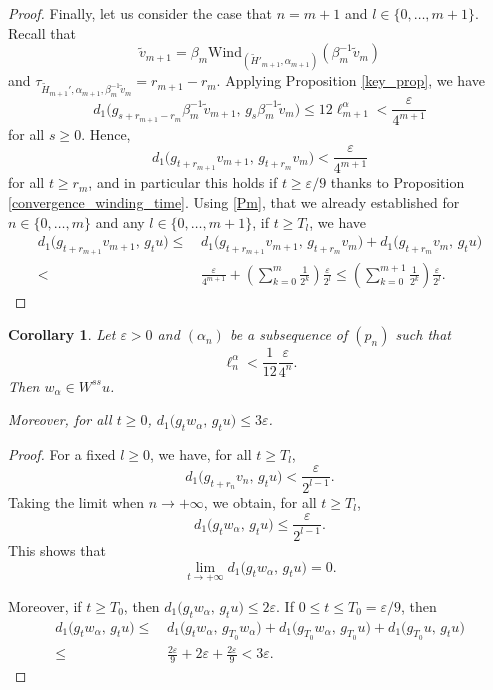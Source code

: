 \documentclass[a4paper,english,reqno]{amsart}
\newtheorem{corollary}{Corollary}
\theoremstyle{definition}
\numberwithin{equation}{section}
\begin{document}
\begin{proof}
Finally, let us consider the case that $n=m+1$ and $l\in \{0,\dots,m+1\}$. 
Recall that \[\tilde v_{m+1}=\beta_m \mathrm{Wind}_{(\tilde  H'_{m+1}, \alpha_{m+1})}(\beta_m^{-1} \tilde v_m)\] and $\tau_{\tilde H_{m+1}', \alpha_{m+1}, \beta_{m}^{-1}\tilde v_m} = r_{m+1}-r_m$. Applying Proposition \ref{key_prop}, we have
\[
d_1\big(g_{s+r_{m+1}-r_m} \beta_m^{-1}\tilde v_{m+1},\, g_{s} \beta_m^{-1} \tilde v_m\big) \le 12 \ell^{\alpha}_{m+1} < \frac{\varepsilon}{4^{m+1}}
\]
for all $s\ge 0$. Hence,
\[
d_1\big(g_{t+r_{m+1}} v_{m+1},\, g_{t+r_m} v_m\big) < \frac{\varepsilon}{4^{m+1}}
\]
for all $t\ge r_m$, and in particular this holds if $t\ge \varepsilon/ 9$ thanks to Proposition \ref{convergence_winding_time}. Using \ref{Pm}, that we already established for $n\in\{0,\dots,m\}$ and any $l\in \{0,\dots,m+1\}$, if $t\ge T_l$, we have
\begin{align*}
	d_1\big(g_{t+r_{m+1}} v_{m+1},\, g_t u\big) \le & \, d_1\big(g_{t+r_{m+1}} v_{m+1},\, g_{t+r_m} v_m\big) + d_1\big(g_{t+r_m} v_m,\, g_t u\big) \\
	 <& \, \frac{\varepsilon}{4^{m+1}} + \left(\sum_{k=0}^{m} \frac{1}{2^k}\right)\frac{\varepsilon}{2^l} \le \left(\sum_{k=0}^{m+1} \frac{1}{2^k}\right)\frac{\varepsilon}{2^l}.
\end{align*}

	
\end{proof}

\begin{corollary}\label{cor1}
	Let $\varepsilon>0$ and $(\alpha_n)$ be a subsequence of $(p_n)$ such that
	\[
	\ell_n^\alpha < \frac{1}{12}\frac{\varepsilon}{4^n}.
	\]
	Then $w_\alpha \in W^{ss} u$.
	
	Moreover, for all $t\ge 0$, $d_1\big(g_{t} w_{\alpha},\, g_t u\big)\le 3\varepsilon$.
\end{corollary}
\begin{proof}
	For a fixed $l\ge 0$, we have, for all $t\ge T_l$,
	\[
	d_1\big(g_{t+r_n} v_n,\, g_t u\big)
	<
	\frac{\varepsilon}{2^{l-1}}.
	\]
	Taking the limit when $n\to +\infty$, we obtain, for all $t\ge T_l$,
	\[
	d_1\big(g_{t} w_{\alpha},\, g_t u\big)
	\le
	\frac{\varepsilon}{2^{l-1}}.
	\]
	This shows that \[\lim_{t\to +\infty} d_1\big(g_{t} w_{\alpha},\, g_t u\big) = 0.\]
	
	Moreover, if $t\ge T_0$, then $d_1\big(g_{t} w_{\alpha},\, g_t u\big)\le 2\varepsilon$. If $0\le t\le T_0=\varepsilon/9$, then
	\begin{align*}
		d_1\big(g_{t} w_{\alpha},\, g_t u\big) \le& \, d_1\big(g_{t} w_{\alpha},\, g_{T_0} w_{\alpha}) + d_1\big(g_{T_0} w_{\alpha},\, g_{T_0} u\big) + d_1\big(g_{T_0} u,\, g_t u\big) \\
		\le&\,  \frac{2\varepsilon}{9} + 2\varepsilon + \frac{2\varepsilon}{9} < 3\varepsilon.
	\end{align*}

	
\end{proof}
\end{document}
